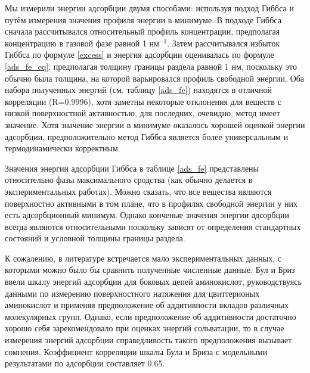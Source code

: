 Мы измерили энергии адсорбции двумя способами: используя подход Гиббса и путём измерения значения профиля энергии в минимуме. В подходе Гиббса сначала рассчитывался относительный профиль концентрации, предполагая концентрацию в газовой фазе равной 1 нм$^{-3}$. Затем рассчитывался избыток Гиббса по формуле \ref{excess} и энергия адсорбции оценивалась по формуле \ref{ads_fe_eq}, предполагая толщину границы раздела равной 1 нм, поскольку это обычно была толщина, на которой варьировался профиль свободной энергии.
Оба набора полученных энергий (см. таблицу \ref{ads_fe}) находятся в отличной корреляции (R=0.9996), хотя заметны некоторые отклонения для веществ с низкой поверхностной активностью, для последних, очевидно, метод имеет значение. Хотя значение энергии в минимуме оказалось хорошей оценкой энергии адсорбции, предположительно метод Гиббса является более универсальным и термодинамически корректным. 






Значения энергии адсорбции Гиббса в таблице \ref{ads_fe} представлены относительно фазы максимального сродства (как обычно делается в экспериментальных работах). Можно сказать, что все вещества являются поверхностно активными в том плане, что в профилях свободной энергии у них есть адсорбционный минимум. Однако конченые значения энергии адсорбции всегда являются относительными поскольку зависят от определения стандартных состояний и условной толщины границы раздела.

К сожалению, в литературе встречается мало экспериментальных данных, с которыми можно было бы сравнить полученные численные данные. Бул и Бриз \cite{bull_breese} ввели шкалу энергий адсорбции для боковых цепей аминокислот, руководствуясь данными по измерению поверхностного натяжения для цвиттерионых аминокислот и применяя предположение об аддитивности вкладов различных молекулярных групп. Однако, если предположение об аддитивности достаточно хорошо себя зарекомендовало при оценках энергий сольватации, то в случае измерения энергий адсорбции справедливость такого предположения вызывает сомнения.
Коэффициент корреляции шкалы Була и Бриза с модельными результатами по адсорбции составляет 0.65.

